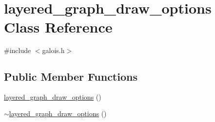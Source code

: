 \hypertarget{classlayered__graph__draw__options}{}\section{layered\+\_\+graph\+\_\+draw\+\_\+options Class Reference}
\label{classlayered__graph__draw__options}


{\ttfamily \#include $<$galois.\+h$>$}

\subsection*{Public Member Functions}
\begin{DoxyCompactItemize}
\item 
\mbox{\hyperlink{classlayered__graph__draw__options_a51a621cff05f067587ce444a491e176f}{layered\+\_\+graph\+\_\+draw\+\_\+options}} ()
\item 
\mbox{\hyperlink{classlayered__graph__draw__options_a280aadc2c1ba5f37a1bbb497be973710}{$\sim$layered\+\_\+graph\+\_\+draw\+\_\+options}} ()
\item 

\end{DoxyCompactItemize}
